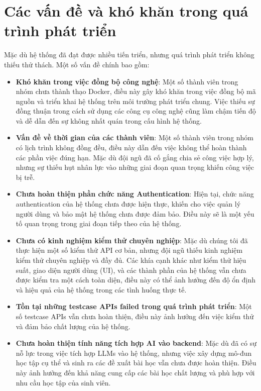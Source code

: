 \section{Các vấn đề và khó khăn trong quá trình phát triển}

Mặc dù hệ thống đã đạt được nhiều tiến triển, nhưng quá trình phát triển không thiếu thử thách. Một số vấn đề chính bao gồm:

\begin{itemize}
    \item \textbf{Khó khăn trong việc đồng bộ công nghệ}: Một số thành viên trong nhóm chưa thành thạo Docker, điều này gây khó khăn trong việc đồng bộ mã nguồn và triển khai hệ thống trên môi trường phát triển chung. Việc thiếu sự đồng thuận trong cách sử dụng các công cụ công nghệ cũng làm chậm tiến độ và dễ dẫn đến sự không nhất quán trong cấu hình hệ thống.
    \item \textbf{Vấn đề về thời gian của các thành viên}: Một số thành viên trong nhóm có lịch trình không đồng đều, điều này dẫn đến việc không thể hoàn thành các phần việc đúng hạn. Mặc dù đội ngũ đã cố gắng chia sẻ công việc hợp lý, nhưng sự thiếu hụt nhân lực vào những giai đoạn quan trọng khiến công việc bị trễ.
    \item \textbf{Chưa hoàn thiện phần chức năng Authentication}: Hiện tại, chức năng authentication của hệ thống chưa được hiện thực, khiến cho việc quản lý người dùng và bảo mật hệ thống chưa được đảm bảo. Điều này sẽ là một yếu tố quan trọng trong giai đoạn tiếp theo của hệ thống.
    \item \textbf{Chưa có kinh nghiệm kiểm thử chuyên nghiệp}: Mặc dù chúng tôi đã thực hiện một số kiểm thử API cơ bản, nhưng đội ngũ thiếu kinh nghiệm kiểm thử chuyên nghiệp và đầy đủ. Các khía cạnh khác như kiểm thử hiệu suất, giao diện người dùng (UI), và các thành phần của hệ thống vẫn chưa được kiểm tra một cách toàn diện, điều này có thể ảnh hưởng đến độ ổn định và hiệu quả của hệ thống trong các tình huống thực tế.
    \item \textbf{Tồn tại những testcase APIs failed trong quá trình phát triển}: Một số testcase APIs vẫn chưa hoàn thiện, điều này ảnh hưởng đến việc kiểm thử và đảm bảo chất lượng của hệ thống.
    \item \textbf{Chưa hoàn thiện tính năng tích hợp AI vào backend}: Mặc dù đã có sự nỗ lực trong việc tích hợp LLMs vào hệ thống, nhưng việc xây dựng mô-đun học tập cụ thể và sinh ra các đề xuất bài học vẫn chưa được hoàn thiện. Điều này ảnh hưởng đến khả năng cung cấp các bài học chất lượng và phù hợp với nhu cầu học tập của sinh viên.
\end{itemize}

